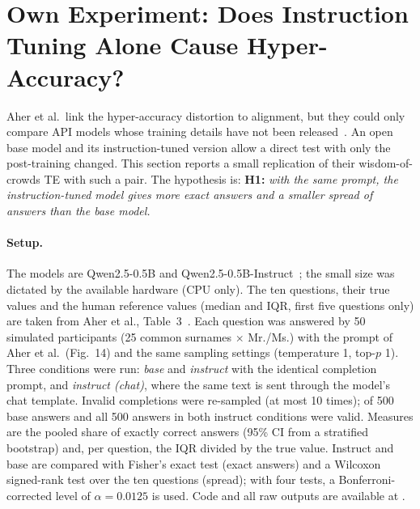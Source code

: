 \section{Own Experiment: Does Instruction Tuning Alone Cause Hyper-Accuracy?}
\label{sec:experiment}

Aher et al.\ link the hyper-accuracy distortion to alignment, but they could only compare API models whose training details have not been released~\cite{aher2023using}. %
An open base model and its instruction-tuned version allow a direct test with only the post-training changed. This section reports a small replication of their wisdom-of-crowds TE with such a pair. The hypothesis is:
\textbf{H1:} \emph{with the same prompt, the instruction-tuned model gives more exact answers and a smaller spread of answers than the base model.}

\paragraph{Setup.} The models are Qwen2.5-0.5B and Qwen2.5-0.5B-Instruct~\cite{qwen2024qwen25}; the small size was dictated by the available hardware (CPU only). The ten questions, their true values and the human reference values (median and IQR, first five questions only) are taken from Aher et al., Table~3~\cite{aher2023using}. %
Each question was answered by 50 simulated participants (25 common surnames $\times$ Mr./Ms.) with the prompt of Aher et al.\ (Fig.~14) and the same sampling settings (temperature 1, top-$p$ 1). %
Three conditions were run: \emph{base} and \emph{instruct} with the identical completion prompt, and \emph{instruct (chat)}, where the same text is sent through the model's chat template. Invalid completions were re-sampled (at most 10 times); \xBaseNValid{} of 500 base answers and all 500 answers in both instruct conditions were valid. Measures are the pooled share of exactly correct answers (95\% CI from a stratified bootstrap) and, per question, the IQR divided by the true value. Instruct and base are compared with Fisher's exact test (exact answers) and a Wilcoxon signed-rank test over the ten questions (spread); with four tests, a Bonferroni-corrected level of $\alpha=0.0125$ is used. Code and all raw outputs are available at \repourl.

